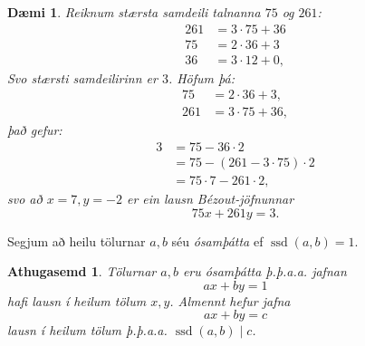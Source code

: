 \documentclass[a4paper,icelandic,11pt]{book}
\theoremstyle{plain}
\newtheorem{daemi}{Dæmi}[chapter]
\newtheorem*{ath}{Athugasemd}
\DeclareMathOperator{\ssd}{ssd} %
\begin{document}
\begin{daemi}
  Reiknum stærsta samdeili talnanna $75$ og $261$:
  \begin{align*}
    261 &= 3\cdot 75 + 36 \\
    75 &= 2\cdot 36 + 3 \\
    36 &= 3\cdot 12 + 0,
  \end{align*}
  Svo stærsti samdeilirinn er $3$.
  Höfum þá:
  \begin{align*}
    75 &= 2\cdot 36 + 3, \\
    261 &= 3\cdot 75 + 36,
  \end{align*}
  það gefur:
  \begin{align*}
    3 &= 75 - 36 \cdot 2 \\
    &= 75 - (261 - 3\cdot 75) \cdot 2 \\
    &= 75 \cdot 7 - 261 \cdot 2,
  \end{align*}
  svo að $x = 7, y= -2$ er ein lausn Bézout-jöfnunnar
  \[ 75x + 261y = 3. \]
\end{daemi}
\begin{skilgr}
  Segjum að heilu tölurnar $a,b$ séu
  \emph{ósamþátta}
  ef $\ssd(a,b) = 1$.
\end{skilgr}
\begin{ath}
  Tölurnar $a,b$ eru ósamþátta þ.þ.a.a. jafnan \[ ax+by = 1 \] hafi lausn í
  heilum tölum $x,y$. Almennt hefur jafna \[ax + by = c\] lausn í heilum tölum
  þ.þ.a.a. $\ssd(a,b) \mid c$.
\end{ath}
\end{document}
